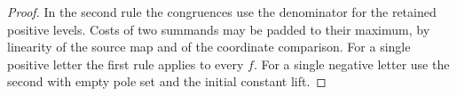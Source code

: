 \begin{proof}
In the second rule the congruences use the denominator for the
retained positive levels. Costs of two summands may be padded
to their maximum, by linearity of the source map and of the
coordinate comparison. For a single positive letter the first
rule applies to every \(f\). For a single negative letter use
the second with empty pole set and the initial constant lift.
\end{proof}

